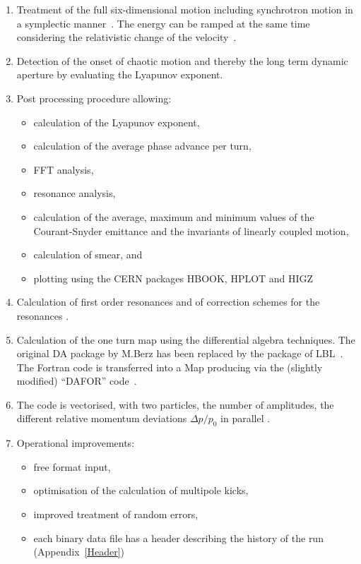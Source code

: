 \begin{enumerate}
    \item Treatment of the full six-dimensional motion including synchrotron motion in a symplectic manner~\cite{Ripken85}. The energy can be ramped at the same time considering the relativistic change of the velocity~\cite{Ripken87}.
    \item Detection of the onset of chaotic motion and thereby the long term dynamic aperture by evaluating the Lyapunov exponent.
    \item Post processing procedure allowing:
    \begin{itemize}
        \item calculation of the Lyapunov exponent,
        \item calculation of the average phase advance per turn,
        \item FFT analysis,
        \item resonance analysis,
        \item calculation of the average, maximum and minimum values of the Courant-Snyder emittance and the invariants of linearly coupled motion,
        \item calculation of smear, and
        \item plotting using the CERN packages HBOOK, HPLOT and HIGZ \cite{HBOOK,HPLOT,HIGZ}
    \end{itemize}
    \item Calculation of first order resonances and of correction schemes for the resonances \cite{Gilbert78}.
    \item Calculation of the one turn map using the differential algebra techniques. The original DA package by M.Berz \cite{Berz89} has been replaced by the package of LBL~\cite{DALIE}. The Fortran code is transferred into a Map producing via the (slightly modified) ``DAFOR'' code~\cite{DAFOR}.
    \item The code is vectorised, with two particles, the number of amplitudes, the different relative momentum deviations $\Delta p/p_0$ in parallel \cite{Sixvec}.
    \item Operational improvements:
    \begin{itemize}
        \item free format input,
        \item optimisation of the calculation of multipole kicks,
        \item improved treatment of random errors,
        \item each binary data file has a header describing the history of the run (Appendix~\ref{Header})
    \end{itemize}
\end{enumerate}

